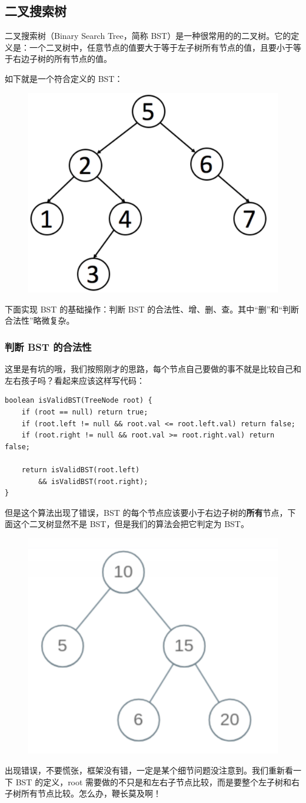 \documentclass[12pt]{article}
\begin{document}
\subsection{二叉搜索树}
二叉搜索树（Binary Search Tree，简称 BST）是一种很常用的的二叉树。它的定义是：一个二叉树中，任意节点的值要大于等于左子树所有节点的值，且要小于等于右边子树的所有节点的值。

如下就是一个符合定义的 BST：
\begin{figure}[H]
    \centering
    \includegraphics[width=.3\textwidth]{fig/BST_1.png}
\end{figure}

下面实现 BST 的基础操作：判断 BST 的合法性、增、删、查。其中“删”和“判断合法性”略微复杂。
\subsubsection{判断 BST 的合法性}
这里是有坑的哦，我们按照刚才的思路，每个节点自己要做的事不就是比较自己和左右孩子吗？看起来应该这样写代码：
\begin{lstlisting}
boolean isValidBST(TreeNode root) {
    if (root == null) return true;
    if (root.left != null && root.val <= root.left.val) return false;
    if (root.right != null && root.val >= root.right.val) return false;

    return isValidBST(root.left)
        && isValidBST(root.right);
}
\end{lstlisting}

但是这个算法出现了错误，BST 的每个节点应该要小于右边子树的\textbf{所有}节点，下面这个二叉树显然不是 BST，但是我们的算法会把它判定为 BST。
\begin{figure}[H]
    \centering
    \includegraphics[width=.3\textwidth]{fig/BST_2.png}
\end{figure}
出现错误，不要慌张，框架没有错，一定是某个细节问题没注意到。我们重新看一下 BST 的定义，root 需要做的不只是和左右子节点比较，而是要整个左子树和右子树所有节点比较。怎么办，鞭长莫及啊！
\end{document}
